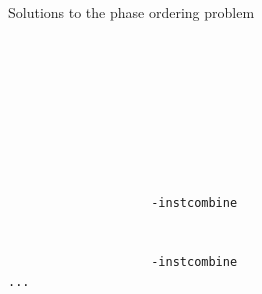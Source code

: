 \documentclass[8pt]{beamer}
\begin{document}
\begin{frame}[fragile]{Solutions to the phase ordering problem}
\begin{verbatim}
                                                                    
                                                                       
                                                                     
                                                                        
                                                                              
                                                                       
                                                                       
                                                                
                    -instcombine                                               
                                                               
                                                                        
                    -instcombine                                          
...
\end{verbatim}
\end{frame}
\end{document}
